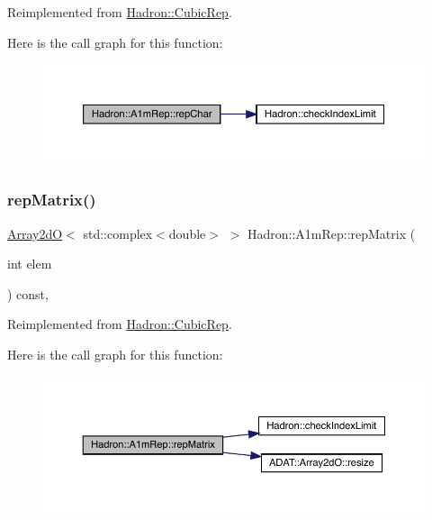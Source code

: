 Reimplemented from \mbox{\hyperlink{structHadron_1_1CubicRep_af45227106e8e715e84b0af69cd3b36f8}{Hadron\+::\+Cubic\+Rep}}.

Here is the call graph for this function\+:
\nopagebreak
\begin{figure}[H]
\begin{center}
\leavevmode
\includegraphics[width=350pt]{d3/dab/structHadron_1_1A1mRep_aae7d6e39a56f0cfd67cb66ad8e1f2f56_cgraph}
\end{center}
\end{figure}
\mbox{\label{structHadron_1_1A1mRep_aa82be422dc6de780227bb8c42dfeab36}} 
\subsubsection{\texorpdfstring{repMatrix()}{repMatrix()}\hspace{0.1cm}{\footnotesize\ttfamily [1/2]}}
{\footnotesize\ttfamily \mbox{\hyperlink{classADAT_1_1Array2dO}{Array2dO}}$<$ std\+::complex$<$double$>$ $>$ Hadron\+::\+A1m\+Rep\+::rep\+Matrix (\begin{DoxyParamCaption}\item[{int}]{elem }\end{DoxyParamCaption}) const\hspace{0.3cm}{\ttfamily [inline]}, {\ttfamily [virtual]}}



Reimplemented from \mbox{\hyperlink{structHadron_1_1CubicRep_ac5d7e9e6f4ab1158b5fce3e4ad9e8005}{Hadron\+::\+Cubic\+Rep}}.

Here is the call graph for this function\+:
\nopagebreak
\begin{figure}[H]
\begin{center}
\leavevmode
\includegraphics[width=350pt]{d3/dab/structHadron_1_1A1mRep_aa82be422dc6de780227bb8c42dfeab36_cgraph}
\end{center}
\end{figure}
\mbox{\label{structHadron_1_1A1mRep_aa82be422dc6de780227bb8c42dfeab36}} 

